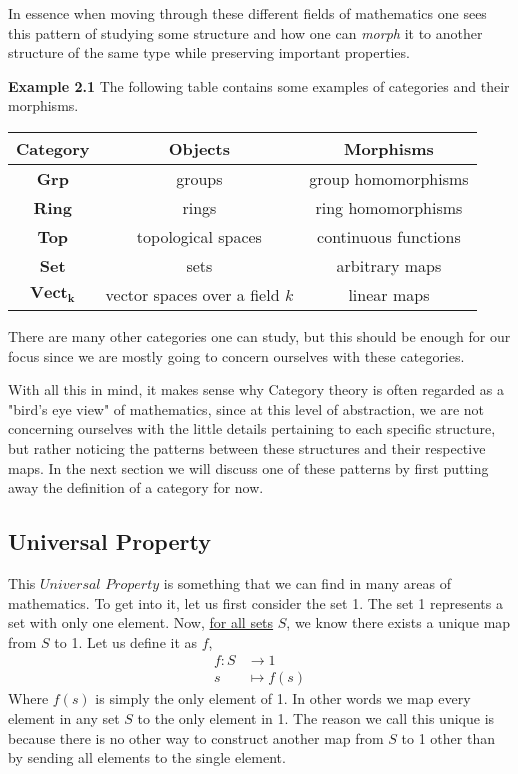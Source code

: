 \documentclass[12pt]{article}
\theoremstyle{definition}
\theoremstyle{remark}
\begin{document}
In essence when moving through these different fields of mathematics one sees this pattern of studying some structure and how one can \textit{morph} it to another structure of the same type while preserving important properties.
\vspace{.5cm}

\noindent\textbf{Example 2.1} The following table contains some examples of categories and their morphisms. 

\begin{center}
    \begin{tabular}{ |c|c|c| } 
     \hline
     Category & Objects & Morphisms   \\ 
     \hline \hline
     \textbf{Grp} & groups & group homomorphisms  \\ 
     \hline
     \textbf{Ring} & rings & ring homomorphisms  \\ 
     \hline 
     \textbf{Top} & topological spaces & continuous functions \\
     \hline
     \textbf{Set} &  sets & arbitrary maps \\ 
     \hline
     $\boldsymbol{\textbf{Vect}_k}$ & vector spaces over a field $k$ & linear maps \\
     \hline
    \end{tabular}
\end{center}


There are many other categories one can study, but this should be enough for our focus since we are mostly going to concern ourselves with these categories.

With all this in mind, it makes sense why Category theory is often regarded as a "bird's eye view" of mathematics, since at this level of abstraction, we are not concerning ourselves with the little details pertaining to each specific structure, but rather noticing the patterns between these structures and their respective maps. In the next section we will discuss one of these patterns by first putting away the definition of a category for now. 
\newpage
\subsection{Universal Property} This $\textit{Universal Property}$ is something that we can find in many areas of mathematics. To get into it, let us first consider the set 1. The set 1 represents a set with only one element. Now, \underline{for all sets} $S$, we know there exists a unique map from $S$ to 1. Let us define it as $f$,
\begin{align*}
    f: S &\to 1 \\
    s &\mapsto f(s)
\end{align*}
Where $f(s)$ is simply the only element of 1. In other words we map every element in any set $S$ to the only element in 1. The reason we call this unique is because there is no other way to construct another map from $S$ to 1 other than by sending all elements to the single element. 
\end{document}
